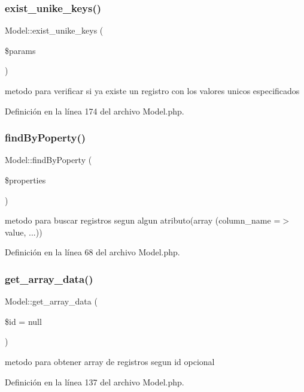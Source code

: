 \subsubsection{\texorpdfstring{exist\_unike\_keys()}{exist\_unike\_keys()}}
{\footnotesize\ttfamily Model\+::exist\+\_\+unike\+\_\+keys (\begin{DoxyParamCaption}\item[{}]{\$params }\end{DoxyParamCaption})}

metodo para verificar si ya existe un registro con los valores unicos especificados 

Definición en la línea 174 del archivo Model.\+php.

\mbox{\label{class_model_a067c962b5ac1b38809aba6c8b7af46b1}} 
\subsubsection{\texorpdfstring{findByPoperty()}{findByPoperty()}}
{\footnotesize\ttfamily Model\+::find\+By\+Poperty (\begin{DoxyParamCaption}\item[{}]{\$properties }\end{DoxyParamCaption})}

metodo para buscar registros segun algun atributo(array (column\+\_\+name =$>$ value, ...)) 

Definición en la línea 68 del archivo Model.\+php.

\mbox{\label{class_model_a62dd5265f2009c4111dc8117f815eb27}} 
\subsubsection{\texorpdfstring{get\_array\_data()}{get\_array\_data()}}
{\footnotesize\ttfamily Model\+::get\+\_\+array\+\_\+data (\begin{DoxyParamCaption}\item[{}]{\$id = {\ttfamily null} }\end{DoxyParamCaption})}

metodo para obtener array de registros segun id opcional 

Definición en la línea 137 del archivo Model.\+php.


